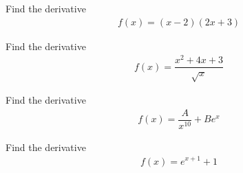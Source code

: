 \begin{exercise}
Find the derivative
\begin{align*}
    f(x) = (x-2)(2x+3)
\end{align*}
\end{exercise}

\begin{exercise}
Find the derivative
\begin{align*}
    f(x) = \dfrac{x^{2} + 4x + 3}{\sqrt{x}}
\end{align*}
\end{exercise}

\begin{exercise}
Find the derivative
\begin{align*}
    f(x) = \dfrac{A}{x^{10}} + Be^{x}
\end{align*}
\end{exercise}

\begin{exercise}
Find the derivative
\begin{align*}
    f(x) = e^{x+1} + 1
\end{align*}
\end{exercise}

